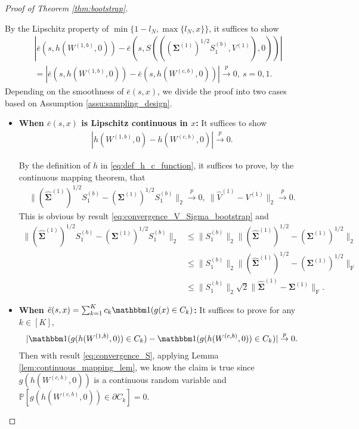 \documentclass[12pt]{article}
\def\P{\mathbb{P}}
\def\P{\mathbb{P}}
\renewcommand{\P}{\mathbb{P}}							%
\newcommand{\indicator}{\mathbbm 1}						%
\newcommand{\convp}{\overset p \rightarrow}             %
\begin{document}
\begin{proof}[Proof of Theorem \ref{thm:bootstrap}]
\begin{enumerate}
		By the Lipschitz property of $\min\{1-l_N,\max\{l_N,x\}\}$, it suffices to show 
		\begin{align*}
			&
			|\bar e(s, h(W^{(1,b)},0))-\bar e(s, S(((\bm \Sigma^{(1)})^{1/2} S_1^{(b)},V^{(1)}),0))|\\
			&
			=|\bar e(s, h(W^{(1,b)},0))-\bar e(s, h(W^{(c,b)},0))|\convp 0,\ s=0,1.
		\end{align*}
		Depending on the smoothness of $\bar e(s,x)$, we divide the proof into two cases based on Assumption \ref{assu:sampling_design}. 
		\begin{itemize}
			\item \textbf{When $\bar e(s,x)$ is Lipschitz continuous in $x$:} It suffices to show 
			\begin{align}\label{eq:convergence_S}
				|h(W^{(1,b)},0)-h(W^{(c,b)},0)|\convp 0.
			\end{align}
		
			By the definition of $h$ in \eqref{eq:def_h_c_function}, it suffices to prove, by the continuous mapping theorem, that
			\begin{align*}
				\|(\hat{\bm \Sigma}^{(1)})^{1/2} S_1^{(b)}-(\bm \Sigma^{(1)})^{1/2} S_1^{(b)}\|_2\convp 0,\ \|\hat V^{(1)}-V^{(1)}\|_2\convp 0.
			\end{align*}
			This is obvious by result \eqref{eq:convergence_V_Sigma_bootstrap} and 
			\begin{align*}
				\|(\hat{\bm \Sigma}^{(1)})^{1/2} S_1^{(b)}-(\bm \Sigma^{(1)})^{1/2} S_1^{(b)}\|_2
				&
				\leq \|S_1^{(b)}\|_2\|(\hat{\bm \Sigma}^{(1)})^{1/2}-(\bm \Sigma^{(1)})^{1/2}\|_2\\
				&
				\leq \|S_1^{(b)}\|_2\|(\hat{\bm \Sigma}^{(1)})^{1/2}-(\bm \Sigma^{(1)})^{1/2}\|_{\mathrm{F}}\\
				&
				\leq \|S_1^{(b)}\|_2\sqrt{2}\|\hat{\bm \Sigma}^{(1)}-\bm \Sigma^{(1)}\|_{\mathrm{F}}.
			\end{align*}
		
		
			\item \textbf{When $\bar e(s,x)=\sum_{k=1}^K c_k\indicator(g(x)\in C_k)$:} It suffices to prove for any $k\in [K]$,
			\begin{align*}
				|\indicator(g(h(W^{(1,b)},0))\in C_k)-\indicator(g(h(W^{(c,b)},0))\in C_k)|\convp 0.
			\end{align*}
			Then with result \eqref{eq:convergence_S}, applying Lemma \ref{lem:continuous_mapping_lem}, we know the claim is true since $g(h(W^{(c,b)},0))$ is a continuous random variable and $\P[g(h(W^{(c,b)},0))\in\partial C_k]=0$.
		\end{itemize}


\end{enumerate}
\end{proof}
\end{document}

